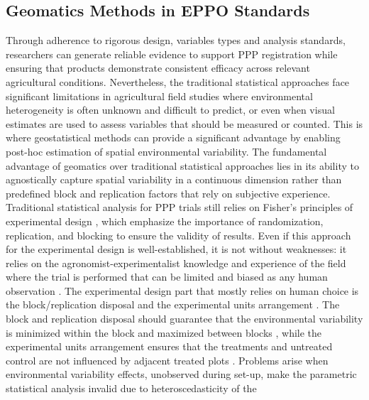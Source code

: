 \documentclass[12pt,a4paper,oneside]{report}
\begin{document}
\subsection{Geomatics Methods in EPPO Standards}

Through adherence to rigorous design, variables types and analysis standards, researchers can 
generate reliable evidence to support PPP registration while ensuring 
that products demonstrate consistent efficacy across relevant agricultural conditions.
Nevertheless, the traditional statistical approaches face significant limitations in
agricultural field studies where environmental heterogeneity is often unknown and
difficult to predict, or even when visual estimates are used to assess
variables that should be measured or counted.
This is where geostatistical methods
can provide a significant advantage by enabling post-hoc estimation of spatial
environmental variability.
The fundamental advantage of geomatics over traditional statistical approaches 
lies in its ability to agnostically capture spatial variability in a continuous dimension 
rather than predefined block and replication factors that rely on subjective experience. 
Traditional statistical analysis for PPP trials still relies on 
Fisher's principles of experimental design 
\cite{fisherStatisticalMethodsResearch1992,meadStatisticalPrinciplesDesign2012,caslerFundamentalsExperimentalDesign2015},
which emphasize the importance of randomization, replication, and blocking to 
ensure the validity of results. Even if this approach for the experimental design 
is well-established, it is not without weaknesses: it relies on the 
agronomist-experimentalist knowledge and experience of the field where the trial 
is performed that can be limited and biased as any human observation 
\cite{paroliniPursuitScienceAgriculture2015,berryResistedRiseRandomisation2015}. 
The experimental design part 
that mostly relies on human choice is the block/replication disposal and the experimental units 
arrangement \cite{tocherDesignAnalysisBlock1952,williamsOptimalityContrastsBlock2015}. 
The block and replication disposal 
should guarantee that the environmental variability is minimized within the block
and maximized between blocks \cite{vanesSpatialNatureRandomization1993,brienMultiphaseExperimentsLeast2011}, 
while 
the experimental units arrangement ensures that the treatments and untreated control are not influenced by 
adjacent treated plots \cite{piephoWhyRandomizeAgricultural2013}.
Problems arise when environmental variability effects, unobserved during set-up, 
make the parametric statistical analysis invalid due to heteroscedasticity of the 
\end{document}

